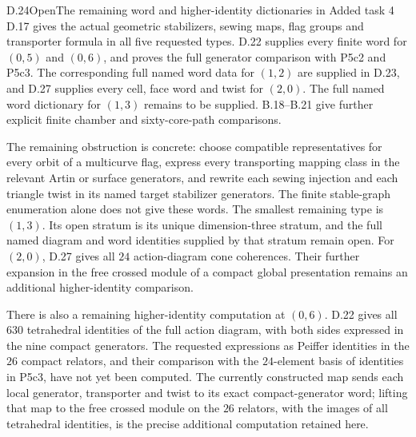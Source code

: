 \begin{result}{D.24}{Open}{The remaining word and higher-identity dictionaries in Added task 4}
D.17 gives the actual geometric stabilizers, sewing maps,
flag groups and transporter formula in all five requested
types.  D.22 supplies every finite word for $(0,5)$ and
$(0,6)$, and proves the full generator comparison with
P5c2 and P5c3.  The corresponding full named word data
for $(1,2)$ are supplied in D.23, and D.27 supplies every
cell, face word and twist for $(2,0)$.  The full named
word dictionary for $(1,3)$ remains to be supplied.
B.18--B.21 give further explicit
finite chamber and sixty-core-path comparisons.

The remaining obstruction is concrete: choose compatible
representatives for every orbit of a multicurve flag,
express every transporting mapping class in the relevant
Artin or surface generators, and rewrite each sewing
injection and each triangle twist in its named target
stabilizer generators.  The finite stable-graph enumeration
alone does not give these words.  The smallest remaining
type is $(1,3)$.  Its open stratum is its unique
dimension-three stratum, and the full named diagram and
word identities supplied by that stratum remain open.
For $(2,0)$, D.27 gives all $24$ action-diagram cone
coherences.  Their further expansion in the free crossed
module of a compact global presentation remains an
additional higher-identity comparison.

There is also a remaining higher-identity computation at $(0,6)$.
D.22 gives all $630$ tetrahedral identities of the full action
diagram, with both sides expressed in the nine compact generators.
The requested expressions as Peiffer identities in the $26$
compact relators, and their comparison with the $24$-element
basis of identities in P5c3, have not yet been computed.
The currently constructed map sends each local generator,
transporter and twist to its exact compact-generator word;
lifting that map to the free crossed module on the $26$
relators, with the images of all tetrahedral identities,
is the precise additional computation retained here.
\end{result}

